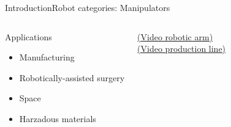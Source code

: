 \documentclass[10pt,compress]{beamer} %
\begin{document}
\begin{frame}{Introduction}{Robot categories: Manipulators}
   \begin{columns}
	   \begin{block}{Applications}
	   \begin{itemize}
	   \item Manufacturing
	   \item Robotically-assisted surgery 
	   \item Space
	   \item Harzadous materials
	   \end{itemize}
	   \end{block}
	   \href{https://www.youtube.com/watch?v=7coUcEHxnYA}{(Video robotic arm)}\\
	   \href{https://www.youtube.com/watch?v=sjAZGUcjrP8}{(Video production line)}



\end{columns}
\end{frame}
\end{document}
